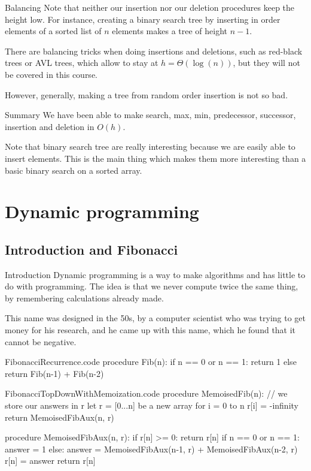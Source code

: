\documentclass[a4paper]{article}
\begin{document}
\begin{parag}{Balancing}
    Note that neither our insertion nor our deletion procedures keep the height low. For instance, creating a binary search tree by inserting in order elements of a sorted list of $n$ elements makes a tree of height $n-1$.

    There are balancing tricks when doing insertions and deletions, such as red-black trees or AVL trees, which allow to stay at $h = \Theta\left(\log\left(n\right)\right)$, but they will not be covered in this course. 

    However, generally, making a tree from random order insertion is not so bad.
\end{parag}

\begin{parag}{Summary}
    We have been able to make search, max, min, predecessor, successor, insertion and deletion in $O\left(h\right)$.

    Note that binary search tree are really interesting because we are easily able to insert elements. This is the main thing which makes them more interesting than a basic binary search on a sorted array.
\end{parag}

\section{Dynamic programming}
\subsection{Introduction and Fibonacci}

\begin{parag}{Introduction}
    Dynamic programming is a way to make algorithms and has little to do with programming. The idea is that we never compute twice the same thing, by remembering calculations already made.

    This name was designed in the 50s, by a computer scientist who was trying to get money for his research, and he came up with this name, which he found that it cannot be negative.
\end{parag}

\begin{filecontents*}[overwrite]{FibonacciRecurrence.code}
procedure Fib(n):
    if n == 0 or n == 1:
        return 1
    else
        return Fib(n-1) + Fib(n-2)
\end{filecontents*}

\begin{filecontents*}[overwrite]{FibonacciTopDownWithMemoization.code}
procedure MemoisedFib(n):
    // we store our answers in r
    let r = [0...n] be a new array
    for i = 0 to n
        r[i] = -infinity
    return MemoisedFibAux(n, r)

procedure MemoisedFibAux(n, r):
    if r[n] >= 0: return r[n]
    if n == 0 or n == 1:
        answer = 1
    else:
        answer = MemoisedFibAux(n-1, r) + MemoisedFibAux(n-2, r)
    r[n] = answer
    return r[n]
\end{filecontents*}
\end{document}
